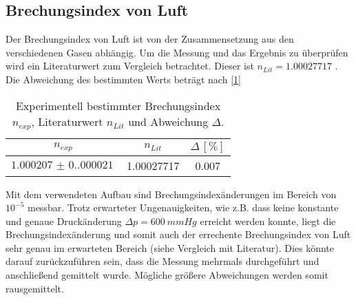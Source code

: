 \subsection{Brechungsindex von Luft}
Der Brechungsindex von Luft ist von der Zusammensetzung aus den verschiedenen Gasen abhängig. Um die Messung und das Ergebnis zu überprüfen wird
ein Literaturwert zum Vergleich betrachtet. Dieser ist $n_{Lit} = 1.00027717$ \cite{n_luft}. Die Abweichung des bestimmten Werts beträgt nach \autoref{1}
\begin{table}[H]
    \centering
    \caption{Experimentell bestimmter Brechungsindex $n_{exp}$, Literaturwert $n_{Lit}$ und Abweichung $\Delta$.}
    \begin{tabular}{c c c}
        \toprule
        $n_{exp}$ & $n_{Lit}$ & $\Delta\,[\unit{\%}]$\\
        \midrule
        $\SI{1.000207(0.000021)}{}$ & 1.00027717 & 0.007\\
        \bottomrule
    \end{tabular}
    \label{tab:abw1}
\end{table}
Mit dem verwendeten Aufbau sind Brechungsindexänderungen im Bereich von $10^{-5}$ messbar. Trotz erwarteter Ungenauigkeiten, wie z.B. 
dass keine konstante und genaue Druckänderung $\Delta p = \SI{600}{mmHg}$ erreicht werden konnte, liegt die Brechungsindexänderung und somit auch 
der errechente Brechungsindex von Luft sehr genau im erwarteten Bereich (siehe Vergleich mit Literatur). Dies könnte darauf zurückzuführen sein, dass die
Messung mehrmals durchgeführt und anschließend gemittelt wurde. Mögliche größere Abweichungen werden somit rausgemittelt.
